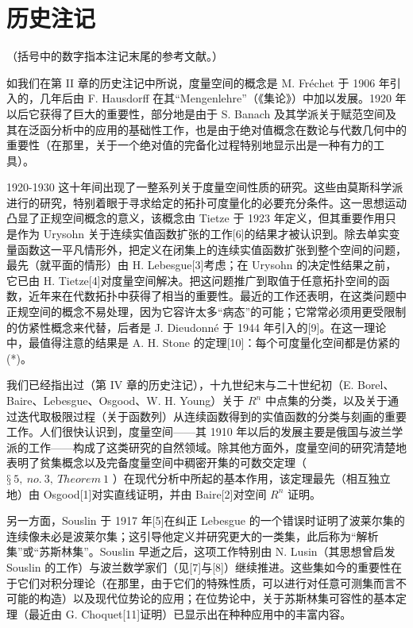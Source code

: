 \section*{历史注记}
{}

（括号中的数字指本注记末尾的参考文献。）

如我们在第 II 章的历史注记中所说，度量空间的概念是 M. Fréchet 于 1906 年引入的，几年后由 F. Hausdorff 在其``Mengenlehre''（《集论》）中加以发展。1920 年以后它获得了巨大的重要性，部分地是由于 S. Banach 及其学派关于赋范空间及其在泛函分析中的应用的基础性工作，也是由于绝对值概念在数论与代数几何中的重要性（在那里，关于一个绝对值的完备化过程特别地显示出是一种有力的工具）。

1920-1930 这十年间出现了一整系列关于度量空间性质的研究。这些由莫斯科学派进行的研究，特别着眼于寻求给定的拓扑可度量化的必要充分条件。这一思想运动凸显了正规空间概念的意义，该概念由 Tietze 于 1923 年定义，但其重要作用只是作为 Urysohn 关于连续实值函数扩张的工作{[}6{]}的结果才被认识到。除去单实变量函数这一平凡情形外，把定义在闭集上的连续实值函数扩张到整个空间的问题，最先（就平面的情形）由 H. Lebesgue{[}3{]}考虑；在 Urysohn 的决定性结果之前，它已由 H. Tietze{[}4{]}对度量空间解决。把这问题推广到取值于任意拓扑空间的函数，近年来在代数拓扑中获得了相当的重要性。最近的工作还表明，在这类问题中正规空间的概念不易处理，因为它容许太多``病态''的可能；它常常必须用更受限制的仿紧性概念来代替，后者是 J. Dieudonné 于 1944 年引入的{[}9{]}。在这一理论中，最值得注意的结果是 A. H. Stone 的定理{[}10{]}：每个可度量化空间都是仿紧的 (*)。

我们已经指出过（第 IV 章的历史注记），十九世纪末与二十世纪初（E. Borel、Baire、Lebesgue、Osgood、W. H. Young）关于 \(R^{n}\) 中点集的分类，以及关于通过迭代取极限过程（关于函数列）从连续函数得到的实值函数的分类与刻画的重要工作。人们很快认识到，度量空间——其 1910 年以后的发展主要是俄国与波兰学派的工作——构成了这类研究的自然领域。除其他方面外，度量空间的研究清楚地表明了贫集概念以及完备度量空间中稠密开集的可数交定理（ \(§\ 5,\ no.\ 3,\ Theorem\ 1\) ）在现代分析中所起的基本作用，该定理最先（相互独立地）由 Osgood{[}1{]}对实直线证明，并由 Baire{[}2{]}对空间 \(R^{n}\) 证明。

另一方面，Souslin 于 1917 年{[}5{]}在纠正 Lebesgue 的一个错误时证明了波莱尔集的连续像未必是波莱尔集；这引导他定义并研究更大的一类集，此后称为``解析集''或``苏斯林集''。Souslin 早逝之后，这项工作特别由 N. Lusin（其思想曾启发 Souslin 的工作）与波兰数学家们（见{[}7{]}与{[}8{]}）继续推进。这些集如今的重要性在于它们对积分理论（在那里，由于它们的特殊性质，可以进行对任意可测集而言不可能的构造）以及现代位势论的应用；在位势论中，关于苏斯林集可容性的基本定理（最近由 G. Choquet{[}11{]}证明）已显示出在种种应用中的丰富内容。

